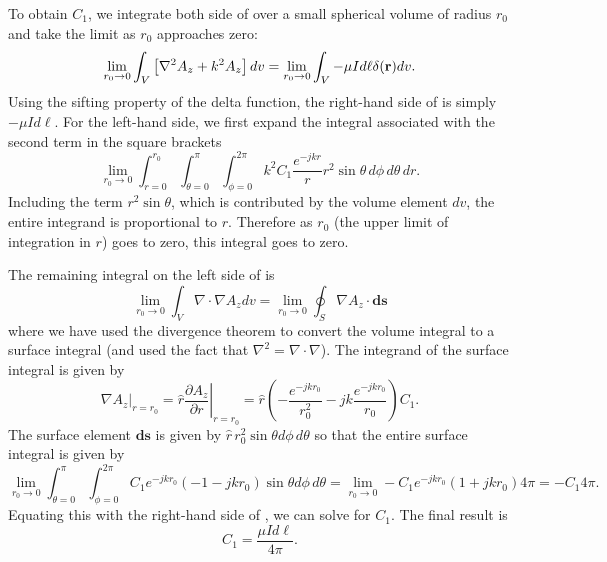 To obtain $C_1$, we integrate both side of 
over a small spherical volume of radius $r_0$ and take the limit as
$r_0$ approaches zero:
\begin{equation}
  \lim_{r_0\rightarrow 0} \int_V
  \left[\nabla^2 A_z + k^2 A_z\right] dv
   = 
  \lim_{r_0\rightarrow 0}
  \int_V -\mu I d\ell \delta(\mathbf{r}) dv.
\label{eq:intOfAz}
\end{equation}
Using the sifting property of the delta function, the right-hand side
of  is simply $-\mu I d\ell$.  For the left-hand side,
we first expand the integral associated with the second term in the
square brackets
\begin{equation}
  \lim_{r_0\rightarrow 0}
  \int_{r=0}^{r_0}
  \int_{\theta=0}^{\pi}
  \int_{\phi=0}^{2\pi}
  k^2 C_1 \frac{e^{-jk r}}{r} r^2\sin\theta\,d\phi\,d\theta\,dr.
\end{equation}
Including the term $r^2\sin\theta$, which is contributed by the
volume element $dv$, the entire integrand is proportional to $r$.
Therefore as $r_0$ (the upper limit of integration in $r$) goes to
zero, this integral goes to zero.

The remaining integral on the left side of  is
\begin{equation}
  \lim_{r_0\rightarrow 0} \int_V
  \nabla\cdot\nabla A_z dv = 
  \lim_{r_0\rightarrow 0}
  \oint_S
  \nabla A_z \cdot \mathbf{ds}
\end{equation}
where we have used the divergence theorem to convert the volume
integral to a surface integral (and used the fact that $\nabla^2 =
\nabla\cdot\nabla$).  The integrand of the surface integral is given
by
\begin{equation}
  \left.\nabla A_z\right|_{r=r_0} = 
  \left.\hat{r}\frac{\partial A_z}{\partial r}\right|_{r=r_0} =
  \hat{r}\left(-\frac{e^{-jk r_0}}{r_0^2}
             -jk\frac{e^{-jk r_0}}{r_0}\right)C_1.
\end{equation}
The surface element $\mathbf{ds}$ is given by $\hat{r}\,r_0^2 \sin\theta
d\phi\,d\theta$ so that the entire surface integral is given by
\begin{equation}
  \lim_{r_0\rightarrow 0}
  \int_{\theta=0}^{\pi}
  \int_{\phi=0}^{2\pi}
  C_1 e^{-jk r_0}(-1-jk r_0)
  \sin\theta d\phi\,d\theta =
  \lim_{r_0\rightarrow 0}
  -C_1 e^{-jk r_0}(1+jk r_0) 4 \pi = -C_1 4 \pi.
\end{equation}
Equating this with the right-hand side of , we
can solve for $C_1$.  The final result is
\begin{equation}
  C_1 = \frac{\mu I d\ell}{4 \pi}.
\end{equation}

